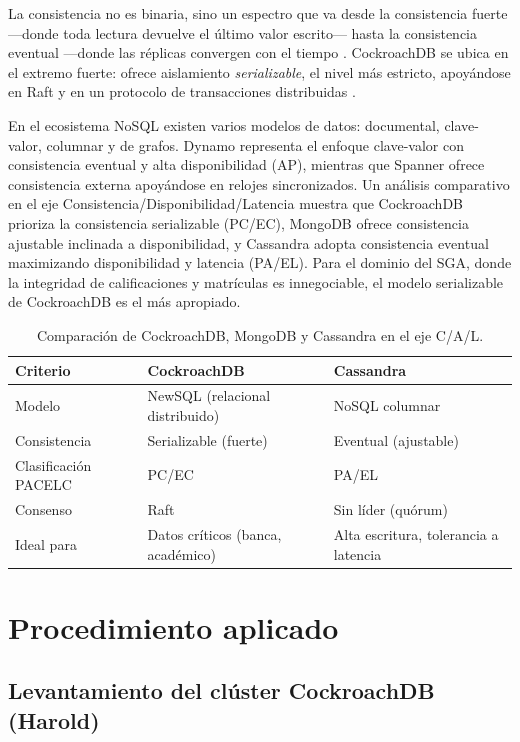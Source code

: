 \documentclass[10pt,a4paper]{article}
\begin{document}
La consistencia no es binaria, sino un espectro que va desde la consistencia fuerte
—donde toda lectura devuelve el último valor escrito— hasta la consistencia eventual
—donde las réplicas convergen con el tiempo \cite{abadi2012}. CockroachDB se ubica en
el extremo fuerte: ofrece aislamiento \emph{serializable}, el nivel más estricto,
apoyándose en Raft y en un protocolo de transacciones distribuidas \cite{taft2020}.

En el ecosistema NoSQL existen varios modelos de datos: documental, clave-valor,
columnar y de grafos. Dynamo \cite{decandia2007} representa el enfoque clave-valor con
consistencia eventual y alta disponibilidad (AP), mientras que Spanner \cite{corbett2013}
ofrece consistencia externa apoyándose en relojes sincronizados. Un análisis
comparativo en el eje Consistencia/Disponibilidad/Latencia muestra que CockroachDB
prioriza la consistencia serializable (PC/EC), MongoDB ofrece consistencia ajustable
inclinada a disponibilidad, y Cassandra adopta consistencia eventual maximizando
disponibilidad y latencia (PA/EL). Para el dominio del SGA, donde la integridad de
calificaciones y matrículas es innegociable, el modelo serializable de CockroachDB es
el más apropiado.

\begin{table}[h]
\centering
\caption{Comparación de CockroachDB, MongoDB y Cassandra en el eje C/A/L.}
\label{tab:nosql}
\small
\begin{tabular}{@{}p{3cm}p{3.5cm}p{3.5cm}@{}}
\toprule
\textbf{Criterio} & \textbf{CockroachDB} & \textbf{Cassandra} \\
\midrule
Modelo & NewSQL (relacional distribuido) & NoSQL columnar \\
\addlinespace
Consistencia & Serializable (fuerte) & Eventual (ajustable) \\
\addlinespace
Clasificación PACELC & PC/EC & PA/EL \\
\addlinespace
Consenso & Raft & Sin líder (quórum) \\
\addlinespace
Ideal para & Datos críticos (banca, académico) & Alta escritura, tolerancia a latencia \\
\bottomrule
\end{tabular}
\end{table}

\section{Procedimiento aplicado}

\subsection{Levantamiento del clúster CockroachDB (Harold)}
\end{document}
